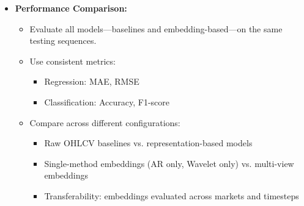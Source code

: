 \begin{itemize}[noitemsep]
    \item \textbf{Performance Comparison:}  
    \begin{itemize}[noitemsep]
        \item Evaluate all models—baselines and embedding-based—on the same testing sequences.
        \item Use consistent metrics:
        \begin{itemize}[noitemsep]
            \item Regression: MAE, RMSE
            \item Classification: Accuracy, F1-score
        \end{itemize}
        \item Compare across different configurations:
        \begin{itemize}[noitemsep]
            \item Raw OHLCV baselines vs. representation-based models
            \item Single-method embeddings (AR only, Wavelet only) vs. multi-view embeddings
            \item Transferability: embeddings evaluated across markets and timesteps
        \end{itemize}
    \end{itemize}
\end{itemize}